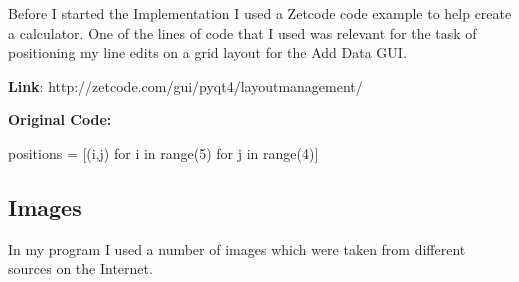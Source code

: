 Before I started the Implementation I used a Zetcode code example to help create a calculator. One of the lines of code that I used was relevant for the task of positioning my line edits on a grid layout for the Add Data GUI. 

\textbf{Link}: http://zetcode.com/gui/pyqt4/layoutmanagement/

\textbf{Original Code:}
\begin{python}
positions = [(i,j) for i in range(5) for j in range(4)]
\end{python}

\newpage

\subsection{Images}

In my program I used a number of images which were taken from different sources on the Internet.

